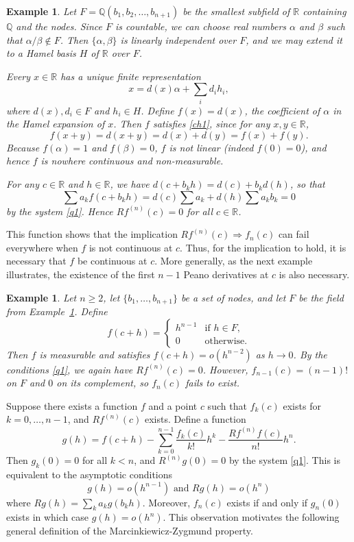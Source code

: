 \documentclass{raex}
\newtheorem{example}[theorem]{Example}
\theoremstyle{definition}
\begin{document}
\begin{example} \label{e1}
Let $F = \mathbb{Q}(b_1, b_2, \ldots, b_{n+1})$ be the smallest subfield of $\mathbb{R}$ containing $\mathbb{Q}$ and the nodes. Since $F$ is countable, we can choose real numbers $\alpha$ and $\beta$ such that $\alpha/\beta \notin F$. Then $\{\alpha, \beta\}$ is linearly independent over $F$, and we may extend it to a Hamel basis $H$ of $\mathbb{R}$ over $F$.

Every $x \in \mathbb{R}$ has a unique finite representation
\[
x = d(x)\alpha + \sum_i d_i h_i,
\]
where $d(x), d_i \in F$ and $h_i \in H$. Define $f(x) = d(x)$, the coefficient of $\alpha$ in the Hamel expansion of $x$. Then $f$ satisfies \eqref{ch1}, since for any $x,y \in \mathbb{R}$,
\[
f(x+y) = d(x+y) = d(x) + d(y) = f(x) + f(y).
\]
Because $f(\alpha) = 1$ and $f(\beta) = 0$, $f$ is not linear (indeed $f(0) = 0$), and hence $f$ is nowhere continuous and non-measurable.

For any $c \in \mathbb{R}$ and $h \in \mathbb{R}$, we have $d(c + b_k h) = d(c) + b_k d(h)$, so that
\[
\sum a_k f(c + b_k h) = d(c) \sum a_k + d(h) \sum a_k b_k = 0
\]
by the system \eqref{q1}. Hence $Rf^{(n)}(c) = 0$ for all $c \in \mathbb{R}$.
\end{example}

This function shows that the implication $Rf^{(n)}(c) \Rightarrow f_n(c)$ can fail everywhere when $f$ is not continuous at $c$. Thus, for the implication to hold, it is necessary that $f$ be continuous at $c$. More generally, as the next example illustrates, the existence of the first $n-1$ Peano derivatives at $c$ is also necessary.

\begin{example}
Let $n \geq 2$, let $\{b_1, \ldots, b_{n+1}\}$ be a set of nodes, and let $F$ be the field from Example~\ref{e1}. Define
\[
f(c + h) =
\begin{cases}
h^{n-1} & \text{if } h \in F, \\
0 & \text{otherwise}.
\end{cases}
\]
Then $f$ is measurable and satisfies $f(c+h) = o(h^{n-2})$ as $h \to 0$. By the conditions \eqref{q1}, we again have $Rf^{(n)}(c) = 0$. However, $f_{n-1}(c) = (n-1)!$ on $F$ and $0$ on its complement, so $f_n(c)$ fails to exist.
\end{example}

 Suppose there exists a function $f$ and a point $c$ such that $f_k(c)$ exists for $k = 0, \dots, n-1$, and $Rf^{(n)}(c)$ exists. Define a function
\[
g(h) = f(c + h) - \sum_{k=0}^{n-1} \frac{f_k(c)}{k!} h^k - \frac{Rf^{(n)}f(c)}{n!} h^n.
\]
Then $g_k(0) = 0$ for all $k < n$, and $R^{(n)}g(0) = 0$ by the system \eqref{q1}. This is equivalent to the asymptotic conditions \[ g(h)=o(h^{n-1}) \text{ and } Rg(h)=o(h^n)\] where $Rg(h)=\sum_k a_k g(b_k h)$. Moreover, $f_n(c)$ exists if and only if $g_n(0)$ exists  in which case $g(h)=o(h^{n})$. This observation motivates the following general definition of the Marcinkiewicz-Zygmund property.
\end{document}
